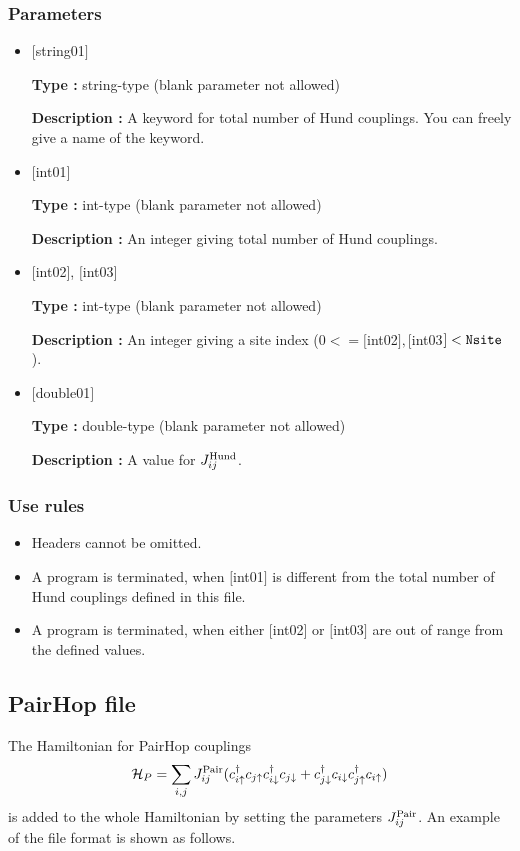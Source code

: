\subsubsection{Parameters}
 \begin{itemize}

   \item  $[$string01$]$
   
    {\bf Type :} string-type (blank parameter not allowed)

   {\bf Description :}  A keyword for total number of Hund couplings. You can freely give a name of the keyword.

   \item  $[$int01$]$
   
    {\bf Type :} int-type (blank parameter not allowed)

   {\bf Description :} An integer giving total number of Hund couplings.

  \item  $[$int02$]$, $[$int03$]$
  
 {\bf Type :} int-type (blank parameter not allowed)

{\bf Description :} An integer giving a site index ($0<= [$int02$], [$int03$]<\verb|Nsite|$).
 
 \item  $[$double01$]$
   
   {\bf Type :} double-type (blank parameter not allowed)

  {\bf Description :}  A value for $J_{ij}^{\rm Hund}$.
  
\end{itemize}

\subsubsection{Use rules}
\begin{itemize}
\item Headers cannot be omitted. 
\item A program is terminated, when $[$int01$]$ is different from the total number of Hund couplings defined in this file.
\item A program is terminated, when either $[$int02$]$ or $[$int03$]$ are out of range from the defined values.
\end{itemize}

\newpage
\subsection{PairHop file}
The Hamiltonian for PairHop couplings
\begin{equation}
{\cal H}_P=\sum_{i,j}J_{ij}^{\rm Pair} (c_ {i \uparrow}^{\dag}c_{j\uparrow}c_{i \downarrow}^{\dag}c_{j  \downarrow}
+c_{j \downarrow}^{\dag}c_{i  \downarrow}c_ {j \uparrow}^{\dag}c_{i\uparrow})
\end{equation}
is added to the whole Hamiltonian by setting the parameters $J_{ij}^{\rm Pair}$.
An example of the file format is shown as follows.

